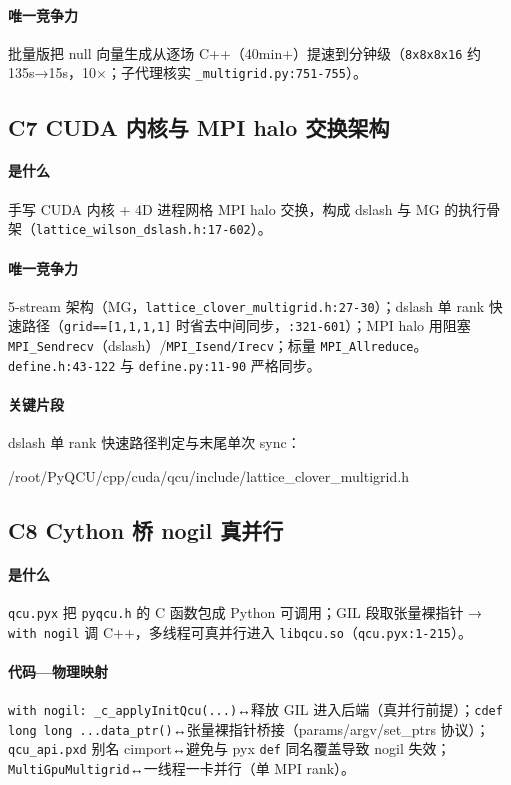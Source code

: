 \documentclass[UTF8]{ctexart}
\begin{document}
\paragraph{唯一竞争力} 批量版把 null 向量生成从逐场 C++（40min+）提速到分钟级（\texttt{8x8x8x16} 约 135s→15s，10×；子代理核实 \texttt{\_multigrid.py:751-755}）。

\subsection{C7 CUDA 内核与 MPI halo 交换架构}
\paragraph{是什么} 手写 CUDA 内核 + 4D 进程网格 MPI halo 交换，构成 dslash 与 MG 的执行骨架（\texttt{lattice\_wilson\_dslash.h:17-602}）。
\paragraph{唯一竞争力} 5-stream 架构（MG，\texttt{lattice\_clover\_multigrid.h:27-30}）；dslash 单 rank 快速路径（\texttt{grid==[1,1,1,1]} 时省去中间同步，\texttt{:321-601}）；MPI halo 用阻塞 \texttt{MPI\_Sendrecv}（dslash）/\texttt{MPI\_Isend/Irecv}；标量 \texttt{MPI\_Allreduce}。\texttt{define.h:43-122} 与 \texttt{define.py:11-90} 严格同步。
\paragraph{关键片段} dslash 单 rank 快速路径判定与末尾单次 sync：
\begin{lstinputlisting}[firstline=1344,lastline=1350,language=c++]{/root/PyQCU/cpp/cuda/qcu/include/lattice_clover_multigrid.h}
\end{lstinputlisting}

\subsection{C8 Cython 桥 nogil 真并行}
\paragraph{是什么} \texttt{qcu.pyx} 把 \texttt{pyqcu.h} 的 C 函数包成 Python 可调用；GIL 段取张量裸指针 → \texttt{with nogil} 调 C++，多线程可真并行进入 \texttt{libqcu.so}（\texttt{qcu.pyx:1-215}）。
\paragraph{代码—物理映射} \texttt{with nogil: \_c\_applyInitQcu(...)}↔释放 GIL 进入后端（真并行前提）；\texttt{cdef long long ...data\_ptr()}↔张量裸指针桥接（params/argv/set\_ptrs 协议）；\texttt{qcu\_api.pxd} 别名 cimport↔避免与 pyx \texttt{def} 同名覆盖导致 nogil 失效；\texttt{MultiGpuMultigrid}↔一线程一卡并行（单 MPI rank）。
\end{document}
